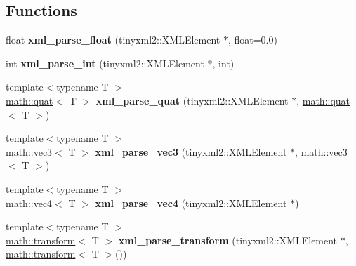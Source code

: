 \subsection*{Functions}
\begin{DoxyCompactItemize}
\item 
\hypertarget{namespacemath_ab9802128cbb57942e824fc6b76b22d01}{
float {\bfseries xml\_\-parse\_\-float} (tinyxml2::XMLElement $\ast$, float=0.0)}
\label{namespacemath_ab9802128cbb57942e824fc6b76b22d01}

\item 
\hypertarget{namespacemath_ad4adf80e60869a4d59af0792ba311be2}{
int {\bfseries xml\_\-parse\_\-int} (tinyxml2::XMLElement $\ast$, int)}
\label{namespacemath_ad4adf80e60869a4d59af0792ba311be2}

\item 
\hypertarget{namespacemath_a88e4d302b1ad84f6d8cc17d6d8c8cddc}{
{\footnotesize template$<$typename T $>$ }\\\hyperlink{classmath_1_1quat}{math::quat}$<$ T $>$ {\bfseries xml\_\-parse\_\-quat} (tinyxml2::XMLElement $\ast$, \hyperlink{classmath_1_1quat}{math::quat}$<$ T $>$)}
\label{namespacemath_a88e4d302b1ad84f6d8cc17d6d8c8cddc}

\item 
\hypertarget{namespacemath_a9ae63d31c1a65ec2af6af01fd72b5c81}{
{\footnotesize template$<$typename T $>$ }\\\hyperlink{classmath_1_1vec3}{math::vec3}$<$ T $>$ {\bfseries xml\_\-parse\_\-vec3} (tinyxml2::XMLElement $\ast$, \hyperlink{classmath_1_1vec3}{math::vec3}$<$ T $>$)}
\label{namespacemath_a9ae63d31c1a65ec2af6af01fd72b5c81}

\item 
\hypertarget{namespacemath_ac5e70e1710f2395334cf5ecff2e65a65}{
{\footnotesize template$<$typename T $>$ }\\\hyperlink{classmath_1_1vec4}{math::vec4}$<$ T $>$ {\bfseries xml\_\-parse\_\-vec4} (tinyxml2::XMLElement $\ast$)}
\label{namespacemath_ac5e70e1710f2395334cf5ecff2e65a65}

\item 
\hypertarget{namespacemath_a47aa4c23b06657f4a08dc3330076a4dc}{
{\footnotesize template$<$typename T $>$ }\\\hyperlink{classmath_1_1transform}{math::transform}$<$ T $>$ {\bfseries xml\_\-parse\_\-transform} (tinyxml2::XMLElement $\ast$, \hyperlink{classmath_1_1transform}{math::transform}$<$ T $>$())}
\label{namespacemath_a47aa4c23b06657f4a08dc3330076a4dc}


\end{DoxyCompactItemize}
